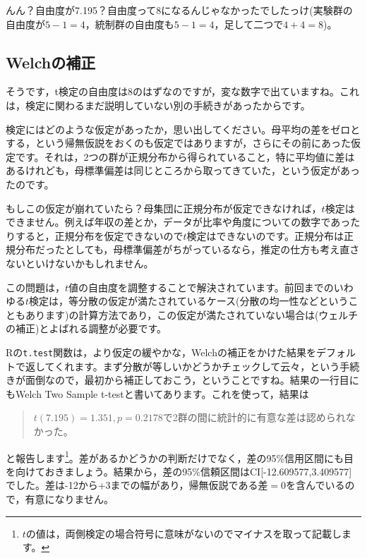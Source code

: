 \documentclass{ltjsbook}
\begin{document}
んん？自由度が7.195？自由度って8になるんじゃなかったでしたっけ(実験群の自由度が$5-1=4$，統制群の自由度も$5-1=4$，足して二つで$4+4=8$)。

\subsection{Welchの補正}
そうです，t検定の自由度は$8$のはずなのですが，変な数字で出ていますね。これは，検定に関わるまだ説明していない別の手続きがあったからです。

検定にはどのような仮定があったか，思い出してください。母平均の差をゼロとする，という帰無仮説をおくのも仮定ではありますが，さらにその前にあった仮定です。それは，2つの群が正規分布から得られていること，特に平均値に差はあるけれども，母標準偏差は同じところから取ってきていた，という仮定があったのです。

もしこの仮定が崩れていたら？母集団に正規分布が仮定できなければ，$t$検定はできません。例えば年収の差とか，データが比率や角度についての数字であったりすると，正規分布を仮定できないので$t$検定はできないのです。正規分布は正規分布だったとしても，母標準偏差がちがっているなら，推定の仕方も考え直さないといけないかもしれません。

この問題は，$t$値の自由度を調整することで解決されています。前回までのいわゆる$t$検定は，等分散の仮定が満たされているケース(分散の均一性などということもあります)の計算方法であり，この仮定が満たされていない場合は(ウェルチの補正)とよばれる調整が必要です。

Rの\texttt{t.test}関数は，より仮定の緩やかな，Welchの補正をかけた結果をデフォルトで返してくれます。まず分散が等しいかどうかチェックして云々，という手続きが面倒なので，最初から補正しておこう，ということですね。結果の一行目にもWelch Two Sample t-testと書いてあります。これを使って，結果は
\begin{quote}
    $t(7.195)=1.351,p = 0.2178$で2群の間に統計的に有意な差は認められなかった。
\end{quote}
と報告します\footnote{$t$の値は，両側検定の場合符号に意味がないのでマイナスを取って記載します。}。差があるかどうかの判断だけでなく，差の95\%信用区間にも目を向けておきましょう。結果から，差の95\%信頼区間はCI[-12.609577,3.409577]でした。差は-12から+3までの幅があり，帰無仮説である差$=0$を含んでいるので，有意になりません。
\end{document}

